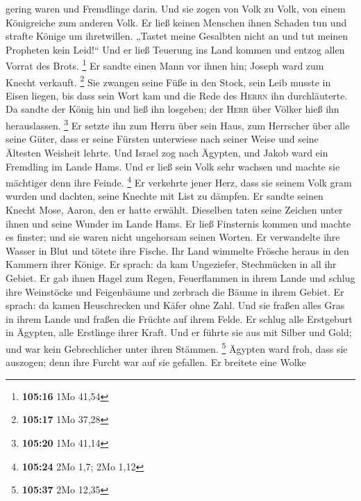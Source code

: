 gering waren und Fremdlinge darin.  Und sie zogen von
Volk zu Volk, von einem Königreiche zum anderen Volk.  Er
ließ keinen Menschen ihnen Schaden tun und strafte Könige um
ihretwillen.  „Tastet meine Gesalbten nicht an und tut
meinen Propheten kein Leid!{}``  Und er ließ Teuerung ins
Land kommen und entzog allen Vorrat des Brots. \footnote{\textbf{105:16}
  1Mo 41,54}  Er sandte einen Mann vor ihnen hin; Joseph
ward zum Knecht verkauft. \footnote{\textbf{105:17} 1Mo 37,28}
 Sie zwangen seine Füße in den Stock, sein Leib musste in
Eisen liegen,  bis dass sein Wort kam und die Rede des
\textsc{Herrn} ihn durchläuterte.  Da sandte der König
hin und ließ ihn losgeben; der \textsc{Herr} über Völker hieß ihn
herauslassen. \footnote{\textbf{105:20} 1Mo 41,14}  Er
setzte ihn zum Herrn über sein Haus, zum Herrscher über alle seine
Güter,  dass er seine Fürsten unterwiese nach seiner
Weise und seine Ältesten Weisheit lehrte.  Und Israel zog
nach Ägypten, und Jakob ward ein Fremdling im Lande Hams.
 Und er ließ sein Volk sehr wachsen und machte sie
mächtiger denn ihre Feinde. \footnote{\textbf{105:24} 2Mo 1,7; 2Mo 1,12}
 Er verkehrte jener Herz, dass sie seinem Volk gram
wurden und dachten, seine Knechte mit List zu dämpfen. 
Er sandte seinen Knecht Mose, Aaron, den er hatte erwählt.
 Dieselben taten seine Zeichen unter ihnen und seine
Wunder im Lande Hams.  Er ließ Finsternis kommen und
machte es finster; und sie waren nicht ungehorsam seinen Worten.
 Er verwandelte ihre Wasser in Blut und tötete ihre
Fische.  Ihr Land wimmelte Frösche heraus in den Kammern
ihrer Könige.  Er sprach: da kam Ungeziefer, Stechmücken
in all ihr Gebiet.  Er gab ihnen Hagel zum Regen,
Feuerflammen in ihrem Lande  und schlug ihre Weinstöcke
und Feigenbäume und zerbrach die Bäume in ihrem Gebiet. 
Er sprach: da kamen Heuschrecken und Käfer ohne Zahl. 
Und sie fraßen alles Gras in ihrem Lande und fraßen die Früchte auf
ihrem Felde.  Er schlug alle Erstgeburt in Ägypten, alle
Erstlinge ihrer Kraft.  Und er führte sie aus mit Silber
und Gold; und war kein Gebrechlicher unter ihren Stämmen. \footnote{\textbf{105:37}
  2Mo 12,35}  Ägypten ward froh, dass sie auszogen; denn
ihre Furcht war auf sie gefallen.  Er breitete eine Wolke
